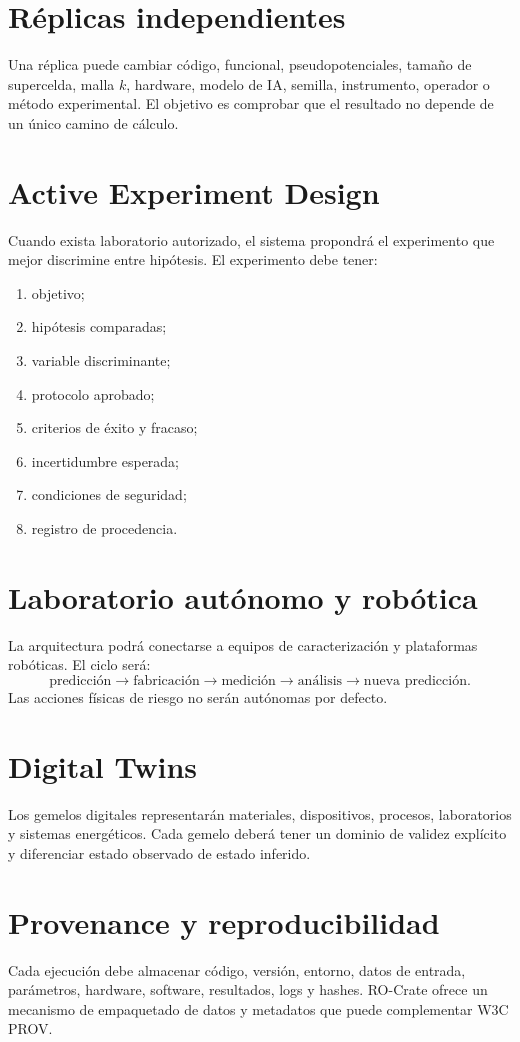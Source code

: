 \documentclass[11pt,a4paper]{article}
\begin{document}
\section{Réplicas independientes}
Una réplica puede cambiar código, funcional, pseudopotenciales, tamaño de supercelda, malla $k$, hardware, modelo de IA, semilla, instrumento, operador o método experimental. El objetivo es comprobar que el resultado no depende de un único camino de cálculo.

\section{Active Experiment Design}
Cuando exista laboratorio autorizado, el sistema propondrá el experimento que mejor discrimine entre hipótesis. El experimento debe tener:
\begin{enumerate}
\item objetivo;
\item hipótesis comparadas;
\item variable discriminante;
\item protocolo aprobado;
\item criterios de éxito y fracaso;
\item incertidumbre esperada;
\item condiciones de seguridad;
\item registro de procedencia.
\end{enumerate}

\section{Laboratorio autónomo y robótica}
La arquitectura podrá conectarse a equipos de caracterización y plataformas robóticas. El ciclo será:
\[
\text{predicción}\rightarrow\text{fabricación}\rightarrow\text{medición}\rightarrow\text{análisis}\rightarrow\text{nueva predicción}.
\]
Las acciones físicas de riesgo no serán autónomas por defecto.

\section{Digital Twins}
Los gemelos digitales representarán materiales, dispositivos, procesos, laboratorios y sistemas energéticos. Cada gemelo deberá tener un dominio de validez explícito y diferenciar estado observado de estado inferido.

\section{Provenance y reproducibilidad}
Cada ejecución debe almacenar código, versión, entorno, datos de entrada, parámetros, hardware, software, resultados, logs y hashes. RO-Crate ofrece un mecanismo de empaquetado de datos y metadatos que puede complementar W3C PROV. \cite{rocrate}
\end{document}
